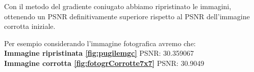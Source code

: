 Con il metodo del gradiente coniugato abbiamo ripristinato le immagini, ottenendo un PSNR definitivamente superiore 
rispetto al PSNR dell'immagine corrotta iniziale.

Per esempio considerando l'immagine fotografica avremo che:\\
\textbf{Immagine ripristinata \ref{fig:pugilemgc}} PSNR: 30.359067\\
\textbf{Immagine corrotta \ref{fig:fotogrCorrotte7x7}} PSNR: 30.9049\\